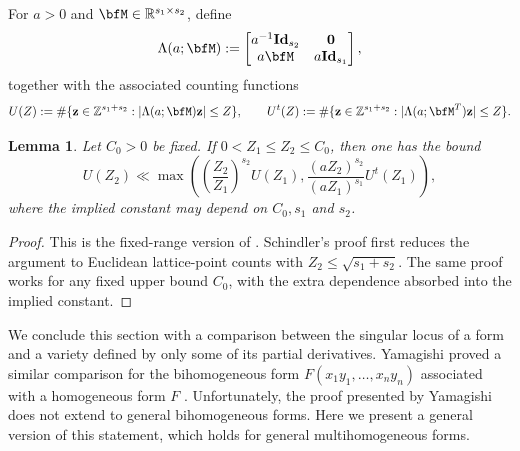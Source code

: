 \documentclass[12pt,reqno]{amsart}
\newtheorem{lemma}[theorem]{Lemma}
\theoremstyle{definition}
\theoremstyle{remark}
\numberwithin{equation}{section}
\def\bfz{{\mathbf z}}
\def\R{{\mathbb R}}\def\T{{\mathbb T}}
\def\Z{{\mathbb Z}}\def\Q{{\mathbb Q}}
\def \id{\text{\textbf{Id}}}
\begin{document}
For $a>0$ and $\bfM\in\R^{s_1\times s_2}$, define
    \[
    \Lambda(a;\bfM):=
    \left[\begin{matrix}
        a^{-1} \id_{s_2} & \bf0 \\
        a \bfM & a \id_{s_1}
    \end{matrix}\right], 
    \]
    together with the associated counting functions
    \[
    U(Z):=\#\{\bfz\in\Z^{s_1+s_2}:|\Lambda(a;\bfM)\bfz|\leq Z\},
    \qquad
    U^t(Z):=\#\{\bfz\in\Z^{s_1+s_2}:|\Lambda(a;\bfM^T)\bfz|\leq Z\}.
    \]
    \begin{lemma}\label{lemma:lattice point comparison}
        Let $C_0>0$ be fixed. If $0<Z_1 \leq Z_2 \leq C_0$, then one has the bound
        \[
        U\left(Z_2\right) \ll \max \left(\left(\frac{Z_2}{Z_1}\right)^{s_2} U\left(Z_1\right), \frac{(aZ_2)^{s_2}}{(aZ_1)^{s_1}} U^t\left(Z_1\right)\right) ,
        \]
        where the implied constant may depend on $C_0,s_1$ and $s_2$.
    \end{lemma} 
    \begin{proof}
        This is the fixed-range version of \cite[Lemma 3.1]{Schindler2014}.
        Schindler's proof first reduces the argument to Euclidean
        lattice-point counts with $Z_2\leq\sqrt{s_1+s_2}$. The same proof
        works for any fixed upper bound $C_0$, with the extra dependence
        absorbed into the implied constant.
    \end{proof}

We conclude this section with a comparison between the singular locus of a
form and a variety defined by only some of its partial derivatives. Yamagishi
proved a similar comparison for the bihomogeneous form
$F(x_1y_1,\ldots,x_ny_n)$ associated with a homogeneous form $F$
\cite[Theorem 5.1]{Yamagishi2019}. Unfortunately, the proof presented by Yamagishi does not 
extend to general bihomogeneous forms. Here we present a general version 
of this statement, which holds for general multihomogeneous forms.
\end{document}

